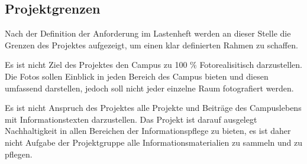 \subsection{Projektgrenzen}
\label{sec:Projektgrenzen}

Nach der Definition der Anforderung im Lastenheft werden an dieser Stelle die Grenzen des Projektes aufgezeigt, um einen klar definierten Rahmen zu schaffen.

Es ist nicht Ziel des Projektes den Campus zu 100 \% Fotorealisitisch darzustellen. Die Fotos sollen Einblick in jeden Bereich des Campus bieten und diesen umfassend darstellen, jedoch soll nicht jeder einzelne Raum fotografiert werden.

Es ist nicht Anspruch des Projektes alle Projekte und Beiträge des Campuslebens mit Informationstexten darzustellen. Das Projekt ist darauf ausgelegt Nachhaltigkeit in allen Bereichen der Informationspflege zu bieten, es ist daher nicht Aufgabe der Projektgruppe alle Informationsmaterialien zu sammeln und zu pflegen.

